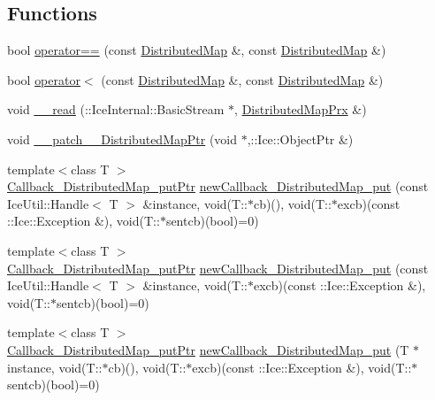 \subsection*{Functions}
\begin{DoxyCompactItemize}
\item 
bool \hyperlink{namespace_global_table_a6c903e747c42db36608f8a7c47012f7e}{operator==} (const \hyperlink{class_global_table_1_1_distributed_map}{DistributedMap} \&, const \hyperlink{class_global_table_1_1_distributed_map}{DistributedMap} \&)
\item 
bool \hyperlink{namespace_global_table_ac8a24b85b1754afdfff19e408825f22c}{operator$<$} (const \hyperlink{class_global_table_1_1_distributed_map}{DistributedMap} \&, const \hyperlink{class_global_table_1_1_distributed_map}{DistributedMap} \&)
\item 
void \hyperlink{namespace_global_table_a1dbaa907b713de7f674f98535b23fc7d}{\_\-\_\-read} (::IceInternal::BasicStream $\ast$, \hyperlink{namespace_global_table_a54672ca2efff5152d9759b4eb9957676}{DistributedMapPrx} \&)
\item 
void \hyperlink{namespace_global_table_af8ed819b515f76203cd95d96251105b4}{\_\-\_\-patch\_\-\_\-DistributedMapPtr} (void $\ast$,::Ice::ObjectPtr \&)
\item 
{\footnotesize template$<$class T $>$ }\\\hyperlink{namespace_global_table_a652e5fcf9acdfd0d854019d109b9644a}{Callback\_\-DistributedMap\_\-putPtr} \hyperlink{namespace_global_table_a8e87d3200f072b263e1b9e06ee82cb6c}{newCallback\_\-DistributedMap\_\-put} (const IceUtil::Handle$<$ T $>$ \&instance, void(T::$\ast$cb)(), void(T::$\ast$excb)(const ::Ice::Exception \&), void(T::$\ast$sentcb)(bool)=0)
\item 
{\footnotesize template$<$class T $>$ }\\\hyperlink{namespace_global_table_a652e5fcf9acdfd0d854019d109b9644a}{Callback\_\-DistributedMap\_\-putPtr} \hyperlink{namespace_global_table_a24d62f9bbaccde753ee29078e432876e}{newCallback\_\-DistributedMap\_\-put} (const IceUtil::Handle$<$ T $>$ \&instance, void(T::$\ast$excb)(const ::Ice::Exception \&), void(T::$\ast$sentcb)(bool)=0)
\item 
{\footnotesize template$<$class T $>$ }\\\hyperlink{namespace_global_table_a652e5fcf9acdfd0d854019d109b9644a}{Callback\_\-DistributedMap\_\-putPtr} \hyperlink{namespace_global_table_a1b1c1f4989bc137512559b0b2e6fb98f}{newCallback\_\-DistributedMap\_\-put} (T $\ast$instance, void(T::$\ast$cb)(), void(T::$\ast$excb)(const ::Ice::Exception \&), void(T::$\ast$sentcb)(bool)=0)

\end{DoxyCompactItemize}
